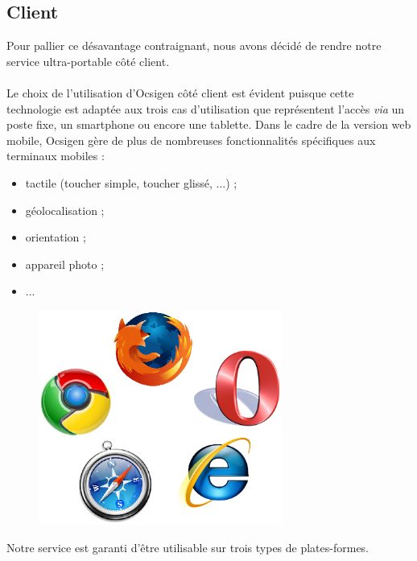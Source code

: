 \documentclass{life-fr}
\begin{document}
\subsection{Client}

Pour pallier ce désavantage contraignant, nous avons décidé de rendre notre
service ultra-portable côté client.\\
\\
Le choix de l'utilisation d'Ocsigen côté client est évident puisque cette 
technologie est adaptée aux trois cas d'utilisation que représentent l'accès
\textit{via} un poste fixe, un smartphone ou encore une tablette. Dans le cadre
de la version web mobile, Ocsigen gère de plus de nombreuses fonctionnalités 
spécifiques aux terminaux mobiles :
\begin{itemize}
  \item tactile (toucher simple, toucher glissé, ...) ;
  \item géolocalisation ;
  \item orientation ;
  \item appareil photo ;
  \item ...
\end{itemize}

\begin{figure}[H]
  \begin{center}
    \includegraphics[width=8cm]{img/navigateurs.png}
  \end{center}
\end{figure}

Notre service est garanti d'être utilisable sur trois types de plates-formes.
\end{document}
